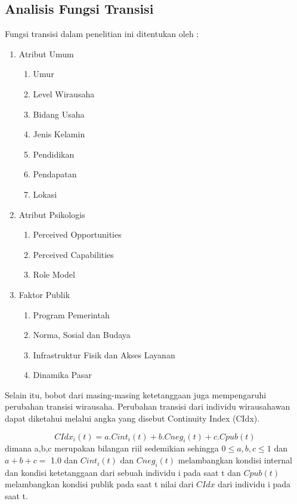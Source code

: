 \subsection{Analisis Fungsi Transisi}
Fungsi transisi dalam penelitian ini ditentukan oleh : 
\begin{enumerate}
	\item Atribut Umum
		\begin{enumerate}
			\item Umur
			\item Level Wirausaha
			\item Bidang Usaha
			\item Jenis Kelamin
			\item Pendidikan
			\item Pendapatan
			\item Lokasi
		\end{enumerate}
	\item Atribut Psikologis
		 \begin{enumerate}
			\item Perceived Opportunities
			\item Perceived Capabilities
			\item Role Model
		 \end{enumerate}
	\item Faktor Publik
		 \begin{enumerate}
			\item Program Pemerintah
			\item Norma, Sosial dan Budaya
			\item Infrastruktur Fisik dan Akses Layanan
			\item Dinamika Pasar
		 \end{enumerate}
\end{enumerate}

Selain itu, bobot dari masing-masing ketetanggaan juga mempengaruhi perubahan transisi wirausaha. Perubahan transisi dari individu wirausahawan dapat diketahui melalui angka yang disebut Continuity Index (CIdx).

\begin{displaymath}
\label{RumusCIDx}
	CIdx_{i}(t) = a.Cint_{i}(t) + b.Cneg_{i}(t) + c.Cpub(t)
\end{displaymath}
dimana a,b,c merupakan bilangan riil sedemikian sehingga $0\leq a,b,c \leq 1$ dan $a+b+c=$ 1.0 dan $Cint_{i}(t)$ dan $Cneg_{i}(t)$ melambangkan kondisi internal dan kondisi ketetanggaan dari sebuah individu i pada saat t dan $Cpub(t)$ melambangkan kondisi publik pada saat t nilai dari $CIdx$ dari individu i pada saat t.

